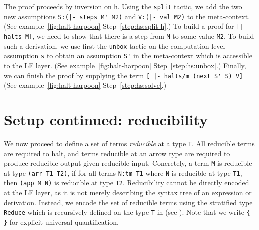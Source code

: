 The proof proceeds by inversion on \lstinline!h!.
Using the \lstinline!split! tactic, we add the two new
assumptions \lstinline!S:(|- steps M' M2)! and
\lstinline!V:(|- val M2)!
to the meta-context. %
(See \Harpoon{} example~\ref{fig:halt-harpoon} Step~\ref{step:hs:split-h}.) %
%
To build a proof for \lstinline![|- halts M]!, we need to show that
there is a step from \lstinline!M! to some value \lstinline!M2!. To
build such a derivation, %
we use first the \lstinline!unbox! tactic on the computation-level
assumption \lstinline!s! to obtain an assumption \lstinline!S'! in the
meta-context which is accessible to the LF layer.
(See \Harpoon{} example~\ref{fig:halt-harpoon} Step~\ref{step:hs:unbox}.)
%
%
Finally, we can finish the proof by supplying the term
\lstinline![ |- halts/m (next S' S) V]!
(See \Harpoon{} example~\ref{fig:halt-harpoon} Step~\ref{step:hs:solve}.)


\section{Setup continued: reducibility}
We now proceed to define
a set of terms \emph{reducible} at a type \lstinline!T!. %
All reducible terms are required to halt, and terms reducible at an arrow type
are required to produce reducible output given reducible input.
Concretely,  a term
\lstinline!M! is reducible at type \lstinline!(arr T1 T2)!,
 if for all
terms \lstinline!N:tm T1! where \lstinline!N! is reducible at type
\lstinline!T1!, then \lstinline!(app M N)! is reducible at type \lstinline!T2!.
Reducibility cannot be directly encoded at the LF layer, as it is not
merely describing the syntax tree of an expression or derivation.
Instead, we encode the set of reducible terms using the stratified
type \lstinline!Reduce! which is recursively defined on the type
\lstinline!T! in \Beluga{} (see \cite{JacobRao:stratified2018}). Note
that we write \lstinline!{ }! for explicit universal quantification.

